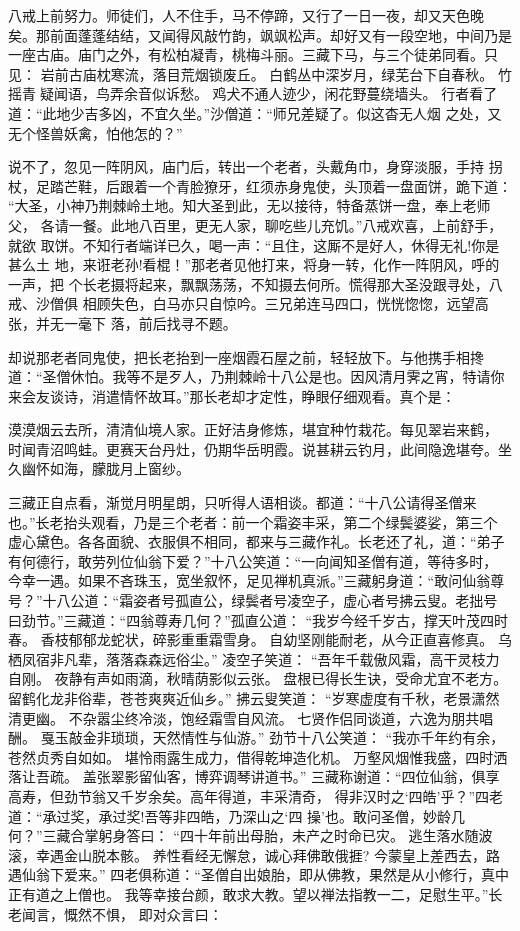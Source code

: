 八戒上前努力。师徒们，人不住手，马不停蹄，又行了一日一夜，却又天色晚
矣。那前面蓬蓬结结，又闻得风敲竹韵，飒飒松声。却好又有一段空地，中间乃是
一座古庙。庙门之外，有松柏凝青，桃梅斗丽。三藏下马，与三个徒弟同看。只见：
岩前古庙枕寒流，落目荒烟锁废丘。
白鹤丛中深岁月，绿芜台下自春秋。
竹摇青疑闻语，鸟弄余音似诉愁。
鸡犬不通人迹少，闲花野蔓绕墙头。
行者看了道：“此地少吉多凶，不宜久坐。”沙僧道：“师兄差疑了。似这杳无人烟
之处，又无个怪兽妖禽，怕他怎的？”

说不了，忽见一阵阴风，庙门后，转出一个老者，头戴角巾，身穿淡服，手持
拐杖，足踏芒鞋，后跟着一个青脸獠牙，红须赤身鬼使，头顶着一盘面饼，跪下道：
“大圣，小神乃荆棘岭土地。知大圣到此，无以接待，特备蒸饼一盘，奉上老师父，
各请一餐。此地八百里，更无人家，聊吃些儿充饥。”八戒欢喜，上前舒手，就欲
取饼。不知行者端详已久，喝一声：“且住，这厮不是好人，休得无礼!你是甚么土
地，来诳老孙!看棍！”那老者见他打来，将身一转，化作一阵阴风，呼的一声，把
个长老摄将起来，飘飘荡荡，不知摄去何所。慌得那大圣没跟寻处，八戒、沙僧俱
相顾失色，白马亦只自惊吟。三兄弟连马四口，恍恍惚惚，远望高张，并无一毫下
落，前后找寻不题。

却说那老者同鬼使，把长老抬到一座烟霞石屋之前，轻轻放下。与他携手相搀
道：“圣僧休怕。我等不是歹人，乃荆棘岭十八公是也。因风清月霁之宵，特请你
来会友谈诗，消遣情怀故耳。”那长老却才定性，睁眼仔细观看。真个是：

漠漠烟云去所，清清仙境人家。正好洁身修炼，堪宜种竹栽花。每见翠岩来鹤，
时闻青沼鸣蛙。更赛天台丹灶，仍期华岳明霞。说甚耕云钓月，此间隐逸堪夸。坐
久幽怀如海，朦胧月上窗纱。

三藏正自点看，渐觉月明星朗，只听得人语相谈。都道：“十八公请得圣僧来
也。”长老抬头观看，乃是三个老者：前一个霜姿丰采，第二个绿鬓婆娑，第三个
虚心黛色。各各面貌、衣服俱不相同，都来与三藏作礼。长老还了礼，道：“弟子
有何德行，敢劳列位仙翁下爱？”十八公笑道：“一向闻知圣僧有道，等待多时，
今幸一遇。如果不吝珠玉，宽坐叙怀，足见禅机真派。”三藏躬身道：“敢问仙翁尊
号？”十八公道：“霜姿者号孤直公，绿鬓者号凌空子，虚心者号拂云叟。老拙号
曰劲节。”三藏道：“四翁尊寿几何？”孤直公道：
“我岁今经千岁古，撑天叶茂四时春。
香枝郁郁龙蛇状，碎影重重霜雪身。
自幼坚刚能耐老，从今正直喜修真。
乌栖凤宿非凡辈，落落森森远俗尘。”
凌空子笑道：
“吾年千载傲风霜，高干灵枝力自刚。
夜静有声如雨滴，秋晴荫影似云张。
盘根已得长生诀，受命尤宜不老方。
留鹤化龙非俗辈，苍苍爽爽近仙乡。”
拂云叟笑道：
“岁寒虚度有千秋，老景潇然清更幽。
不杂嚣尘终冷淡，饱经霜雪自风流。
七贤作侣同谈道，六逸为朋共唱酬。
戛玉敲金非琐琐，天然情性与仙游。”
劲节十八公笑道：
“我亦千年约有余，苍然贞秀自如如。
堪怜雨露生成力，借得乾坤造化机。
万壑风烟惟我盛，四时洒落让吾疏。
盖张翠影留仙客，博弈调琴讲道书。”
三藏称谢道：“四位仙翁，俱享高寿，但劲节翁又千岁余矣。高年得道，丰采清奇，
得非汉时之‘四皓’乎？”四老道：“承过奖，承过奖!吾等非四皓，乃深山之‘四
操’也。敢问圣僧，妙龄几何？”三藏合掌躬身答曰：
“四十年前出母胎，未产之时命已灾。
逃生落水随波滚，幸遇金山脱本骸。
养性看经无懈怠，诚心拜佛敢俄捱?
今蒙皇上差西去，路遇仙翁下爱来。”
四老俱称道：“圣僧自出娘胎，即从佛教，果然是从小修行，真中正有道之上僧也。
我等幸接台颜，敢求大教。望以禅法指教一二，足慰生平。”长老闻言，慨然不惧，
即对众言曰：

